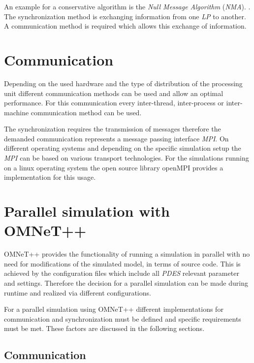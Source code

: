 An example for a conservative algorithm is the \emph{Null Message Algorithm} (\emph{NMA}). \cite[section 2.1]{bagrodia_performance_2000} \cite{Varga03apractical}.
The synchronization method is exchanging information from one \emph{LP} to another.
A communication method is required which allows this exchange of information.

\section{Communication}
\label{sec:parallel_communication}
Depending on the used hardware and the type of distribution of the processing unit different communication methods can be used and allow an optimal performance.
For this communication every inter-thread, inter-process or inter-machine communication method can be used.

The synchronization requires the transmission of messages therefore the demanded communication represents a message passing interface \emph{MPI}.
On different operating systems and depending on the specific simulation setup the \emph{MPI} can be based on various transport technologies.
For the simulations running on a linux operating system the open source library openMPI provides a implementation for this usage. \cite{openmpi_hp}

\section{Parallel simulation with OMNeT++}
\label{sec:parallel_omnet}

OMNeT++ provides the functionality of running a simulation in parallel with no need for modifications of the simulated model, in terms of source code.
This is achieved by the configuration files which include all \emph{PDES} relevant parameter and settings.
Therefore the decision for a parallel simulation can be made during runtime and realized via different configurations. \cite[section III.A]{varga_parallel_2003}

For a parallel simulation using OMNeT++ different implementations for communication and synchronization must be defined and specific requirements must be met.
These factors are discussed in the following sections.

\subsection{Communication}
\label{sec:parallel_omnet_comm}

